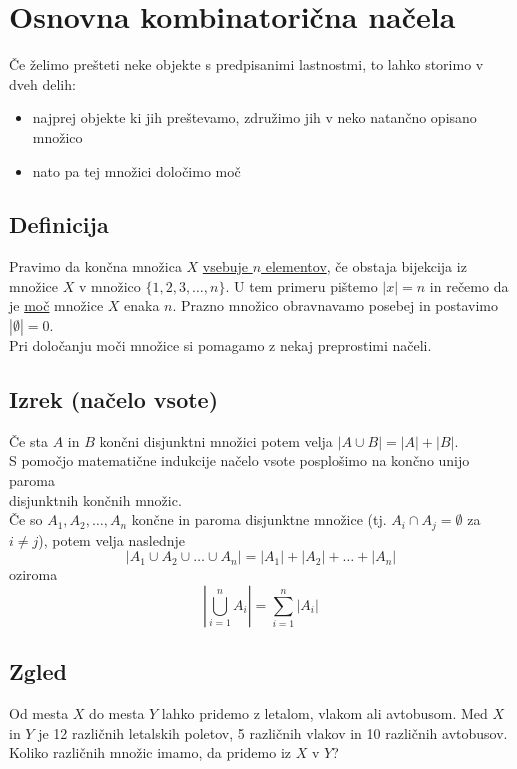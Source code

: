 \section{Osnovna kombinatorična načela}
Če želimo prešteti neke objekte s predpisanimi lastnostmi, to lahko storimo v dveh delih:
\begin{itemize}
    \item najprej objekte ki jih preštevamo, združimo jih v neko natančno opisano množico
    \item nato pa tej množici določimo moč
\end{itemize}

\subsection{Definicija}
Pravimo da končna množica $X$ \underline{vsebuje $n$ elementov}, če obstaja bijekcija iz množice $X$ v množico $\{1, 2, 3, \dots, n\}$. U tem primeru pištemo $|x|=n$ in rečemo da je \underline{moč} množice $X$ enaka $n$. Prazno množico obravnavamo posebej in postavimo $|\emptyset|= 0$. \\[1em]

\noindent
Pri določanju moči množice si pomagamo z nekaj preprostimi načeli.

\subsection{Izrek (načelo vsote)}
Če sta $A$ in $B$ končni disjunktni množici potem velja $|A \cup B| = |A| + |B|$. \\

\noindent
S pomočjo matematične indukcije načelo vsote posplošimo na končno unijo paroma \\ 
disjunktnih končnih množic. \\

\noindent
Če so $A_1, A_2, \dots, A_n$ končne in paroma disjunktne množice (tj. $A_i \cap A_j = \emptyset$ za $i \ne j$), potem velja naslednje
$$
|A_1 \cup A_2 \cup \dots \cup A_n| = |A_1| + |A_2| + \dots + |A_n|
$$
oziroma
$$
\left| \bigcup_{i = 1}^n A_i \right| = \sum_{i = 1}^n |A_i|
$$


\subsection{Zgled}
Od mesta $X$ do mesta $Y$ lahko pridemo z letalom, vlakom ali avtobusom. Med $X$ in $Y$ je 12 različnih letalskih poletov, 5 različnih vlakov in 10 različnih avtobusov. Koliko različnih množic imamo, da pridemo iz $X$ v $Y$? \\

